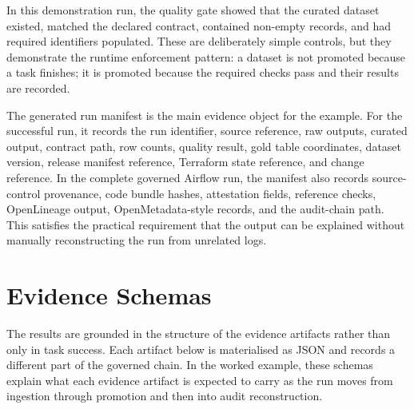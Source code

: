 In this demonstration run, the quality gate showed that the curated dataset
existed, matched the declared contract, contained non-empty records, and had
required identifiers populated. These are deliberately simple controls, but
they demonstrate the runtime enforcement pattern: a dataset is not promoted
because a task finishes; it is promoted because the required checks pass and
their results are recorded.

The generated run manifest is the main evidence object for the example. For the
successful run, it records the run identifier, source reference, raw outputs,
curated output, contract path, row counts, quality result, gold table
coordinates, dataset version, release manifest reference, Terraform state
reference, and change reference. In the complete governed Airflow run, the
manifest also records source-control provenance, code bundle hashes,
attestation fields, reference checks, OpenLineage output,
OpenMetadata-style records, and the audit-chain path. This satisfies the
practical requirement that the output can be explained without manually
reconstructing the run from unrelated logs.

\section{Evidence Schemas}
\noindent
The results are grounded in the structure of the evidence artifacts rather than
only in task success. Each artifact below is materialised as JSON and records a
different part of the governed chain. In the worked example, these schemas
explain what each evidence artifact is expected to carry as the run moves from
ingestion through promotion and then into audit reconstruction.

